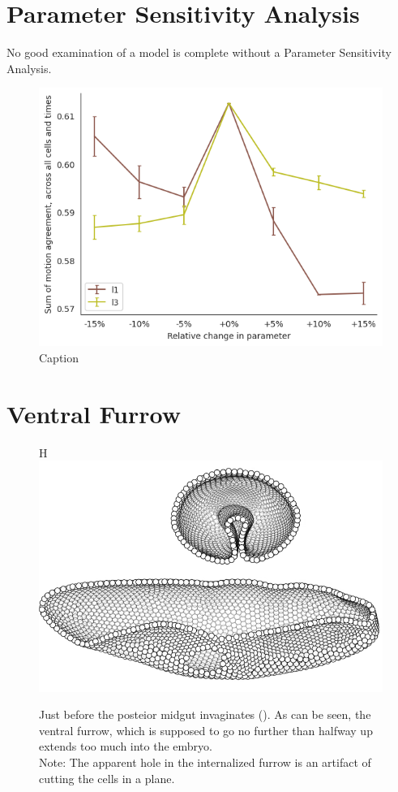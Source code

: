 \section{Parameter Sensitivity Analysis}
No good examination of a model is complete without a Parameter Sensitivity Analysis. 
\begin{figure}[H]
    \centering
    \includegraphics[width=0.8\linewidth]{chapters/Results/figures/PSA.png}
    \caption{Caption}
    \label{fig:enter-label}
\end{figure}
\section{Ventral Furrow}
\label{App:VF}
\begin{figure}{H}
    \centering
    \includegraphics[width=1.\linewidth]{chapters/Appendix/cross_sections.png}
    \caption{Just before the posteior midgut invaginates (). As can be seen, the ventral furrow, which is supposed to go no further than halfway up extends too much into the embryo. \\Note: The apparent hole in the internalized furrow is an artifact of cutting the cells in a plane.}
    \label{fig:enter-label}
\end{figure}
